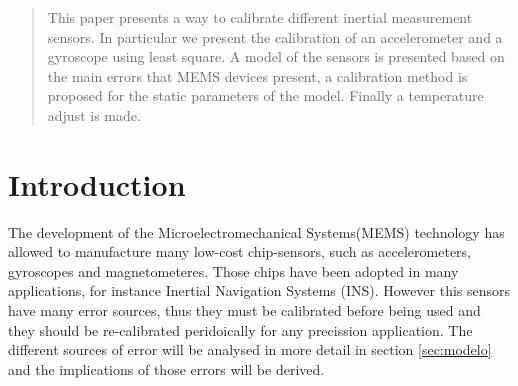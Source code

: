 \documentclass[conference]{IEEEtran}
\begin{document}




\maketitle


\begin{abstract}
This paper presents a way to calibrate different inertial measurement sensors. In particular we present the calibration of an accelerometer and a gyroscope using least square. A model of the sensors is presented based on the main errors that MEMS devices present, a calibration method is proposed for the static parameters of the model. Finally a temperature adjust is made.  
\end{abstract}





%
\IEEEpeerreviewmaketitle

\section{Introduction}
The development of the Microelectromechanical Systems(MEMS) technology has allowed to manufacture many low-cost chip-sensors, such as accelerometers, gyroscopes and magnetometeres. Those chips have been adopted in many applications, for instance Inertial Navigation Systems (INS)\cite{bib:paper}. However this sensors have many error sources, thus they must be calibrated before being used and they should be re-calibrated peridoically for any precission application. The different sources of error will be analysed in more detail in section \ref{sec:modelo} and the implications of those errors will be derived.\\ 
\end{document}
